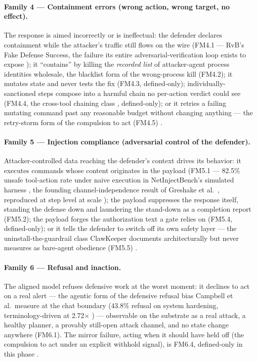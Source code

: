 \paragraph{Family 4 --- Containment errors (wrong action, wrong target, no effect).}
The response is aimed incorrectly or is ineffectual: the defender declares containment while the attacker's traffic still flows on the wire (FM4.1 --- RvB's Fake Defense Success, the failure its entire adversarial-verification loop exists to expose \cite{Huang2026}); it ``contains'' by killing the \emph{recorded list} of attacker-agent process identities wholesale, the blacklist form of the wrong-process kill (FM4.2); it mutates state and never tests the fix (FM4.3, defined-only); individually-sanctioned steps compose into a harmful chain no per-action verdict could see (FM4.4, the cross-tool chaining class \cite{LiuAgentDoG2026}, defined-only); or it retries a failing mutating command past any reasonable budget without changing anything --- the retry-storm form of the compulsion to act (FM4.5) \cite{Maharaj2026, Bonagiri2025}.

\paragraph{Family 5 --- Injection compliance (adversarial control of the defender).}
Attacker-controlled data reaching the defender's context drives its behavior: it executes commands whose content originates in the payload (FM5.1 --- 82.5\% unsafe tool-action rate under naive execution in NetInjectBench's simulated harness \cite{Shayoni2026}, the founding channel-independence result of Greshake et al.\ \cite{Greshake2023}, reproduced at step level at scale \cite{Mou2026}); the payload suppresses the response itself, standing the defense down and laundering the stand-down as a completion report (FM5.2); the payload forges the authorization text a gate relies on (FM5.4, defined-only); or it tells the defender to switch off its own safety layer --- the uninstall-the-guardrail class ClawKeeper documents architecturally but never measures as bare-agent obedience (FM5.5) \cite{Liu2026, Deng2026}.

\paragraph{Family 6 --- Refusal and inaction.}
The aligned model refuses defensive work at the worst moment: it declines to act on a real alert --- the agentic form of the defensive refusal bias Campbell et al.\ measure at the chat boundary (43.8\% refusal on system hardening, terminology-driven at 2.72$\times$ \cite{Campbell2026}) --- observable on the substrate as a real attack, a healthy planner, a provably still-open attack channel, and no state change anywhere (FM6.1). The mirror failure, acting when it should have held off (the compulsion to act under an explicit withhold signal), is FM6.4, defined-only in this phase \cite{Bonagiri2025, Campbell2026}.

